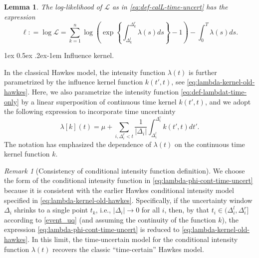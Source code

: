 \documentclass[11pt]{article}
\makeatletter
\newtheorem{lemma}[theorem]{Lemma}
\theoremstyle{remark}
\newtheorem{remark}{Remark}[section]
\theoremstyle{plain}
\newcommand{\calL}{\mathcal{L}}
\renewcommand{\paragraph}{%
  \@startsection{paragraph}{4}%
  {\z@}{1ex \@plus 0.5ex \@minus .2ex}{-1em}%
  {\normalfont\normalsize\itshape}%
}
\makeatother
\begin{document}
%
\begin{lemma}\label{lemma:logL-time-only}
The log-likelihood of $\calL$ as in \eqref{eq:def-calL-time-uncert} has the expression
    \begin{equation}\label{eq:l-lambda-cont-time-uncert}
\ell: =
\log \calL
=   \sum_{k=1}^n
  \log \left( \exp\left\{ \int_{\Delta_{k}^l}^{\Delta_{k}^r}  \lambda(s) ds\right\}  - 1 \right) 
  - \int_{0}^{T}  \lambda(s) ds.
\end{equation}
\end{lemma}



\paragraph{Influence kernel.}

In the classical Hawkes model, the intensity function  $\lambda(t)$ is further parametrized by the influence kernel function  $k(t',t)$, see \eqref{eq:lambda-kernel-old-hawkes}.
Here, we also parametrize the intensity function \eqref{eq:def-lambdat-time-only} by a linear superposition of continuous time kernel $k(t',t)$, and we adopt the following expression to incorporate time uncertainty
\begin{equation}\label{eq:lambda-phi-cont-time-uncert}
    \lambda[k](t) = \mu + \sum_{i, \Delta_i^r < t } \frac{1}{|\Delta_i|} \int_{\Delta_i^l}^{\Delta_i^r} k( t', t) dt'.
\end{equation}
The notation has emphasized the dependence of $\lambda(t)$ on the continuous time kernel function $k$. 

\begin{remark}[Consistency of conditional intensity function definition]
We choose the form of the conditional intensity function in \eqref{eq:lambda-phi-cont-time-uncert}
 because it is consistent with the earlier Hawkes conditional intensity model specified in \eqref{eq:lambda-kernel-old-hawkes}.
Specifically,  if the uncertainty window $\Delta_i$ shrinks to a single point $t_k$,
i.e.,  $|\Delta_i|\rightarrow 0$ for all $i$, 
then,  by that  $t_i \in (\Delta_i^l, \Delta_i^r]$ according to \eqref{event_uq} (and assuming the continuity of the function $k$),
the expression \eqref{eq:lambda-phi-cont-time-uncert} is reduced to \eqref{eq:lambda-kernel-old-hawkes}.
In this limit, the time-uncertain model for the conditional intensity function $\lambda(t)$ recovers the classic ``time-certain'' Hawkes model. 
\end{remark}
\end{document}
